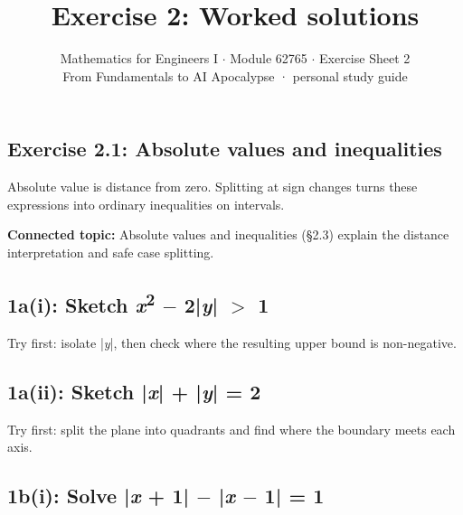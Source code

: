 \documentclass[11pt]{article}
\title{\sffamily\bfseries\color{FAUblue}Exercise 2: Worked solutions}
\author{Mathematics for Engineers I \ensuremath{\cdot} Module 62765 \ensuremath{\cdot} Exercise Sheet 2\\[2pt]\small From Fundamentals to AI Apocalypse · personal study guide}
\date{}
\begin{document}
\maketitle
\begingroup\footnotesize\setlength{\parskip}{0pt}\tableofcontents\endgroup
\clearpage

\begin{keepsection}
\section{Exercise 2.1: Absolute values and inequalities}

Absolute value is distance from zero. Splitting at sign changes turns these expressions into ordinary inequalities on intervals.

\textbf{Connected topic:} Absolute values and inequalities (§2.3) explain the distance interpretation and safe case splitting.

\begin{keepsection}
\subsection{1a(i): Sketch \textit{x}\textsuperscript{2} \ensuremath{-} 2|\textit{y}| \ensuremath{>} 1}

Try first: isolate |\textit{y}|, then check where the resulting upper bound is non-negative.

\end{keepsection}

\begin{keepsection}
\subsection{1a(ii): Sketch |\textit{x}| + |\textit{y}| = 2}

Try first: split the plane into quadrants and find where the boundary meets each axis.

\end{keepsection}

\begin{keepsection}
\subsection{1b(i): Solve |\textit{x} + 1| \ensuremath{-} |\textit{x} \ensuremath{-} 1| = 1}


\end{keepsection}
\end{keepsection}
\end{document}

